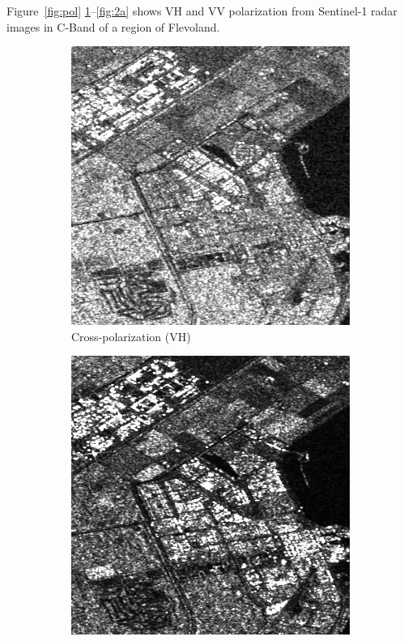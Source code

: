  Figure~\ref{fig:pol} \ref{fig:1a}--\ref{fig:2a} shows VH and VV polarization from Sentinel-1 radar images in C-Band of a region of Flevoland.
\begin{figure}[H]
  \centering
  \begin{subfigure}[b]{0.45\textwidth}
    \centering
    \includegraphics[width=.8\textwidth]{../../Images/PNG/Amplitude_VH.png}
    \caption{Cross-polarization (VH)}
    \label{fig:1a}
  \end{subfigure}
  \hfill
  \begin{subfigure}[b]{0.45\textwidth}
    \centering
    \includegraphics[width=.8\textwidth]{../../Images/PNG/Intensity_VV.png}

\end{subfigure}
\end{figure}
